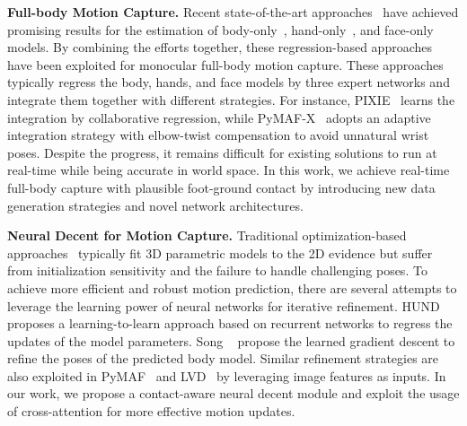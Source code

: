 \documentclass[10pt,twocolumn,letterpaper]{article}
\begin{document}
\textbf{Full-body Motion Capture.} Recent state-of-the-art approaches~\cite{kocabas2021pare,zhang2021pymaf} have achieved promising results for the estimation of body-only~\cite{kocabas2021pare,zhang2021pymaf}, hand-only~\cite{li2022interacting}, and face-only~\cite{DECA_2020} models.
By combining the efforts together, these regression-based approaches have been exploited for monocular full-body motion capture.
These approaches~\cite{choutas2020monocular,rong2020frankmocap,zhou2021monocular,feng2021collaborative,moon2022Hand4Whole,pymafx2022} typically regress the body, hands, and face models by three expert networks and integrate them together with different strategies.
For instance, PIXIE~\cite{feng2021collaborative} learns the integration by collaborative regression, while PyMAF-X~\cite{pymafx2022} adopts an adaptive integration strategy with elbow-twist compensation to avoid unnatural wrist poses.
Despite the progress, it remains difficult for existing solutions to run at real-time while being accurate in world space.
In this work, we achieve real-time full-body capture with plausible foot-ground contact by introducing new data generation strategies and novel network architectures. 









\textbf{Neural Decent for Motion Capture.} Traditional optimization-based approaches~\cite{bogo2016keep} typically fit 3D parametric models to the 2D evidence but suffer from initialization sensitivity and the failure to handle challenging poses.
To achieve more efficient and robust motion prediction, there are several attempts to leverage the learning power of neural networks for iterative refinement.
HUND~\cite{zanfir2021neural} proposes a learning-to-learn approach based on recurrent networks to regress the updates of the model parameters. 
Song \etal~\cite{song2020human} propose the learned gradient descent to refine the poses of the predicted body model.
Similar refinement strategies are also exploited in PyMAF~\cite{zhang2021pymaf} and LVD~\cite{corona2022learned} by leveraging image features as inputs.
In our work, we propose a contact-aware neural decent module and exploit the usage of cross-attention for more effective motion updates.
\end{document}
